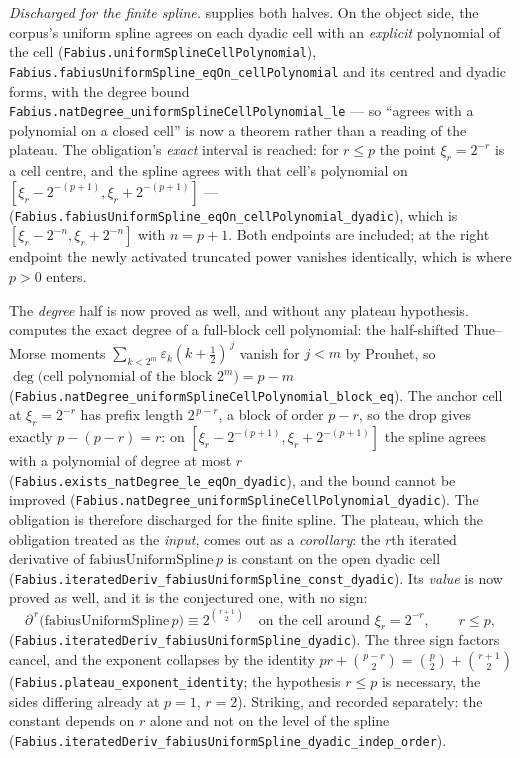 \documentclass[11pt,oneside]{article}
\numberwithin{equation}{section}
\theoremstyle{definition}
\theoremstyle{remark}
\newcommand{\eps}{\varepsilon}
\begin{document}
\begin{obligation}
\emph{Discharged for the finite spline.}   supplies both halves.
On the object side, the corpus's uniform spline agrees on each dyadic cell with an
\emph{explicit} polynomial of the cell (\nolinkurl{Fabius.uniformSplineCellPolynomial}),
\nolinkurl{Fabius.fabiusUniformSpline_eqOn_cellPolynomial} and its centred and dyadic
forms, with the degree bound \nolinkurl{Fabius.natDegree_uniformSplineCellPolynomial_le} --- so
``agrees with a polynomial on a closed cell'' is now a theorem rather than a reading of
the plateau.  The obligation's \emph{exact} interval is reached: for $r\le p$ the point
$\xi_r=2^{-r}$ is a cell centre, and the spline agrees with that cell's polynomial on
$[\xi_r-2^{-(p+1)},\xi_r+2^{-(p+1)}]$ ---
(\nolinkurl{Fabius.fabiusUniformSpline_eqOn_cellPolynomial_dyadic}), which is
$[\xi_r-2^{-n},\xi_r+2^{-n}]$ with $n=p+1$.  Both endpoints are included; at the right
endpoint the newly activated truncated power vanishes identically, which is where
$p>0$ enters.

The \emph{degree} half is now proved as well, and without any plateau hypothesis.
 computes the exact degree of a full-block cell polynomial:
the half-shifted Thue--Morse moments $\sum_{k<2^m}\eps_k(k+\tfrac12)^{\,j}$ vanish for
$j<m$ by Prouhet, so
\(\deg\bigl(\text{cell polynomial of the block } 2^m\bigr)=p-m\)
(\nolinkurl{Fabius.natDegree_uniformSplineCellPolynomial_block_eq}).  The anchor cell at
$\xi_r=2^{-r}$ has prefix length $2^{\,p-r}$, a block of order $p-r$, so the drop gives
exactly $p-(p-r)=r$: on $[\xi_r-2^{-(p+1)},\xi_r+2^{-(p+1)}]$ the spline agrees with a
polynomial of degree at most $r$
(\nolinkurl{Fabius.exists_natDegree_le_eqOn_dyadic}), and the bound cannot be improved
(\nolinkurl{Fabius.natDegree_uniformSplineCellPolynomial_dyadic}).  The obligation is
therefore discharged for the finite spline.  The plateau, which the obligation treated as
the \emph{input}, comes out as a \emph{corollary}: the $r$th iterated derivative of
$\mathrm{fabiusUniformSpline}\,p$ is constant on the open dyadic cell
(\nolinkurl{Fabius.iteratedDeriv_fabiusUniformSpline_const_dyadic}).  Its \emph{value} is
now proved as well, and it is the conjectured one, with no sign:
\[
  \partial^{\,r}\bigl(\mathrm{fabiusUniformSpline}\,p\bigr)\equiv 2^{\binom{r+1}{2}}
  \quad\text{on the cell around }\xi_r=2^{-r},\qquad r\le p,
\]
(\nolinkurl{Fabius.iteratedDeriv_fabiusUniformSpline_dyadic}).  The three sign factors
cancel, and the exponent collapses by the identity $pr+\binom{p-r}{2}=\binom{p}{2}+\binom{r+1}{2}$
(\nolinkurl{Fabius.plateau_exponent_identity}; the hypothesis $r\le p$ is necessary, the
sides differing already at $p=1$, $r=2$).  Striking, and recorded separately: the constant
depends on $r$ alone and not on the level of the spline
(\nolinkurl{Fabius.iteratedDeriv_fabiusUniformSpline_dyadic_indep_order}).


\end{obligation}
\end{document}
